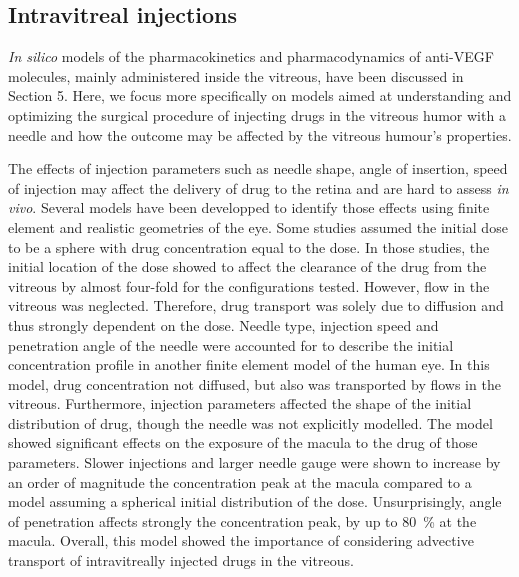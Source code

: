 \documentclass[12pt,a4paper]{journal}
\begin{document}
\subsection*{Intravitreal injections}

\textit{In silico} models of the pharmacokinetics and pharmacodynamics of anti-VEGF molecules, mainly administered inside the vitreous, have been discussed in Section 5.
Here, we focus more specifically on models aimed at understanding and optimizing the surgical procedure of injecting drugs in the vitreous humor with a needle and how the outcome may be affected by the vitreous humour's properties.

The effects of injection parameters such as needle shape, angle of insertion, speed of injection may affect the delivery of drug to the retina and are hard to assess \textit{in vivo}.
Several models have been developped to identify those effects using finite element and realistic geometries of the eye.
Some studies assumed the initial dose to be a sphere with drug concentration equal to the dose.\cite{Friedrich_1997,Friedrich_1997a}
In those studies, the initial location of the dose showed to affect the clearance of the drug from the vitreous by almost four-fold for the configurations tested.\cite{Friedrich_1997}
However, flow in the vitreous was neglected.
Therefore, drug transport was solely due to diffusion and thus strongly dependent on the dose.\cite{Friedrich_1997}
Needle type, injection speed and penetration angle of the needle were accounted for to describe the initial concentration profile in another finite element model of the human eye.\cite{Jooybar_2014}
In this model, drug concentration not diffused, but also was transported by flows in the vitreous.
Furthermore, injection parameters affected the shape of the initial distribution of drug, though the needle was not explicitly modelled.
The model showed significant effects on the exposure of the macula to the drug of those parameters.
Slower injections and larger needle gauge were shown to increase by an order of magnitude the concentration peak at the macula compared to a model assuming a spherical initial distribution of the dose.
Unsurprisingly, angle of penetration affects strongly the concentration peak, by up to \SI{80}{\percent} at the macula.\cite{Jooybar_2014}
Overall, this model showed the importance of considering advective transport of intravitreally injected drugs in the vitreous. 
\end{document}
